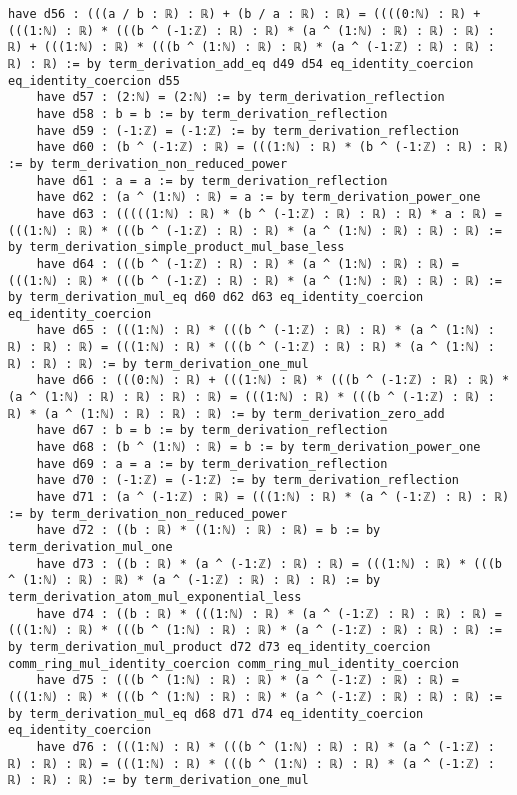 \documentclass{article}
\begin{document}
\begin{tcolorbox}[colback=white!10, width=\linewidth]
\begin{lstlisting}[language=Lean4]
    have d56 : (((a / b : ℝ) : ℝ) + (b / a : ℝ) : ℝ) = ((((0:ℕ) : ℝ) + (((1:ℕ) : ℝ) * (((b ^ (-1:ℤ) : ℝ) : ℝ) * (a ^ (1:ℕ) : ℝ) : ℝ) : ℝ) : ℝ) + (((1:ℕ) : ℝ) * (((b ^ (1:ℕ) : ℝ) : ℝ) * (a ^ (-1:ℤ) : ℝ) : ℝ) : ℝ) : ℝ) := by term_derivation_add_eq d49 d54 eq_identity_coercion eq_identity_coercion d55
    have d57 : (2:ℕ) = (2:ℕ) := by term_derivation_reflection
    have d58 : b = b := by term_derivation_reflection
    have d59 : (-1:ℤ) = (-1:ℤ) := by term_derivation_reflection
    have d60 : (b ^ (-1:ℤ) : ℝ) = (((1:ℕ) : ℝ) * (b ^ (-1:ℤ) : ℝ) : ℝ) := by term_derivation_non_reduced_power
    have d61 : a = a := by term_derivation_reflection
    have d62 : (a ^ (1:ℕ) : ℝ) = a := by term_derivation_power_one
    have d63 : (((((1:ℕ) : ℝ) * (b ^ (-1:ℤ) : ℝ) : ℝ) : ℝ) * a : ℝ) = (((1:ℕ) : ℝ) * (((b ^ (-1:ℤ) : ℝ) : ℝ) * (a ^ (1:ℕ) : ℝ) : ℝ) : ℝ) := by term_derivation_simple_product_mul_base_less
    have d64 : (((b ^ (-1:ℤ) : ℝ) : ℝ) * (a ^ (1:ℕ) : ℝ) : ℝ) = (((1:ℕ) : ℝ) * (((b ^ (-1:ℤ) : ℝ) : ℝ) * (a ^ (1:ℕ) : ℝ) : ℝ) : ℝ) := by term_derivation_mul_eq d60 d62 d63 eq_identity_coercion eq_identity_coercion
    have d65 : (((1:ℕ) : ℝ) * (((b ^ (-1:ℤ) : ℝ) : ℝ) * (a ^ (1:ℕ) : ℝ) : ℝ) : ℝ) = (((1:ℕ) : ℝ) * (((b ^ (-1:ℤ) : ℝ) : ℝ) * (a ^ (1:ℕ) : ℝ) : ℝ) : ℝ) := by term_derivation_one_mul
    have d66 : (((0:ℕ) : ℝ) + (((1:ℕ) : ℝ) * (((b ^ (-1:ℤ) : ℝ) : ℝ) * (a ^ (1:ℕ) : ℝ) : ℝ) : ℝ) : ℝ) = (((1:ℕ) : ℝ) * (((b ^ (-1:ℤ) : ℝ) : ℝ) * (a ^ (1:ℕ) : ℝ) : ℝ) : ℝ) := by term_derivation_zero_add
    have d67 : b = b := by term_derivation_reflection
    have d68 : (b ^ (1:ℕ) : ℝ) = b := by term_derivation_power_one
    have d69 : a = a := by term_derivation_reflection
    have d70 : (-1:ℤ) = (-1:ℤ) := by term_derivation_reflection
    have d71 : (a ^ (-1:ℤ) : ℝ) = (((1:ℕ) : ℝ) * (a ^ (-1:ℤ) : ℝ) : ℝ) := by term_derivation_non_reduced_power
    have d72 : ((b : ℝ) * ((1:ℕ) : ℝ) : ℝ) = b := by term_derivation_mul_one
    have d73 : ((b : ℝ) * (a ^ (-1:ℤ) : ℝ) : ℝ) = (((1:ℕ) : ℝ) * (((b ^ (1:ℕ) : ℝ) : ℝ) * (a ^ (-1:ℤ) : ℝ) : ℝ) : ℝ) := by term_derivation_atom_mul_exponential_less
    have d74 : ((b : ℝ) * (((1:ℕ) : ℝ) * (a ^ (-1:ℤ) : ℝ) : ℝ) : ℝ) = (((1:ℕ) : ℝ) * (((b ^ (1:ℕ) : ℝ) : ℝ) * (a ^ (-1:ℤ) : ℝ) : ℝ) : ℝ) := by term_derivation_mul_product d72 d73 eq_identity_coercion comm_ring_mul_identity_coercion comm_ring_mul_identity_coercion
    have d75 : (((b ^ (1:ℕ) : ℝ) : ℝ) * (a ^ (-1:ℤ) : ℝ) : ℝ) = (((1:ℕ) : ℝ) * (((b ^ (1:ℕ) : ℝ) : ℝ) * (a ^ (-1:ℤ) : ℝ) : ℝ) : ℝ) := by term_derivation_mul_eq d68 d71 d74 eq_identity_coercion eq_identity_coercion
    have d76 : (((1:ℕ) : ℝ) * (((b ^ (1:ℕ) : ℝ) : ℝ) * (a ^ (-1:ℤ) : ℝ) : ℝ) : ℝ) = (((1:ℕ) : ℝ) * (((b ^ (1:ℕ) : ℝ) : ℝ) * (a ^ (-1:ℤ) : ℝ) : ℝ) : ℝ) := by term_derivation_one_mul

\end{lstlisting}
\end{tcolorbox}
\end{document}
